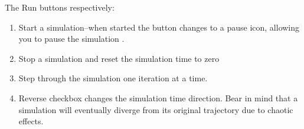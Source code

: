 The Run buttons respectively: 
\begin{enumerate}
\item Start a simulation--when started the button changes to a pause icon,
allowing you to pause the simulation . 
\item Stop a simulation and reset the simulation time to zero 
\item Step through the simulation one iteration at a time. 
\item Reverse checkbox changes the simulation time direction. Bear in mind
that a simulation will eventually diverge from its original trajectory
due to chaotic effects. 
\end{enumerate}

